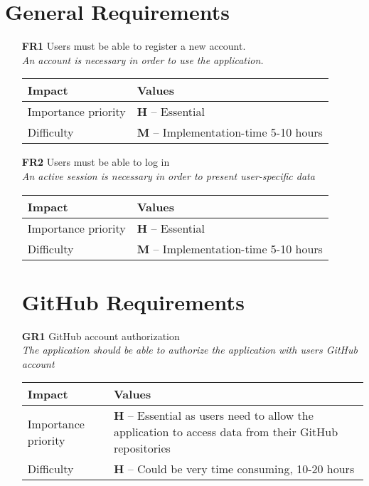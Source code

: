 \section{General Requirements}
\begin{itemize}
    \vspace{0.5cm}
	\item[\textbf{FR1}] Users must be able to register a new account. \\
        \textit{\small{An account is necessary in order to use the application. }}

        \begin{tabular}{| l | p{7cm} |}
            \hline
            \rowcolor[gray]{0.8}
            \textbf{Impact} & \textbf{Values} \\
            \hline
            Importance priority & \textbf{H} -- Essential \\
            Difficulty & \textbf{M} -- Implementation-time 5-10 hours\\
            \hline
        \end{tabular}
    \vspace{0.5cm}
    \item[\textbf{FR2}] Users must be able to log in \\
        \textit{\small{An active session is necessary in order to present user-specific data}}

        \begin{tabular}{| l | p{7cm} |}
            \hline
            \rowcolor[gray]{0.8}
            \textbf{Impact} & \textbf{Values} \\
            \hline
            Importance priority & \textbf{H} -- Essential \\
            Difficulty & \textbf{M} -- Implementation-time 5-10 hours \\
            \hline
        \end{tabular}
    \vspace{0.5cm}

    \section{GitHub Requirements}
    \item[\textbf{GR1}] GitHub account authorization\\
        \textit{\small{The application should be able to authorize the application with users GitHub account}}

        \begin{tabular}{| l | p{7cm} |}
            \hline
            \rowcolor[gray]{0.8}
            \textbf{Impact} & \textbf{Values} \\
            \hline
            Importance priority & \textbf{H} -- Essential as users need to allow the application to access data from their GitHub repositories\\
            Difficulty & \textbf{H} -- Could be very time consuming, 10-20 hours \\
            \hline
        \end{tabular}
    \vspace{0.5cm}


\end{itemize}
